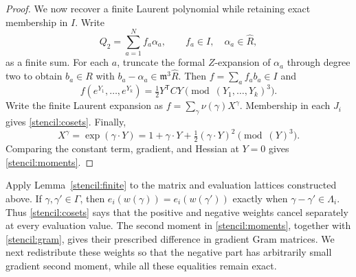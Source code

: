 \begin{proof}
We now recover a finite Laurent polynomial while retaining exact
membership in $I$. Write
\[
 Q_2=\sum_{a=1}^N f_a\alpha_a,
 \qquad f_a\in I,\quad\alpha_a\in\widehat R,
\]
as a finite sum. For each $a$, truncate the formal $Z$-expansion of
$\alpha_a$ through degree two to obtain $b_a\in R$ with
$b_a-\alpha_a\in\mathfrak m^3\widehat R$.
Then $f=\sum_af_ab_a\in I$ and
\[
 f(e^{Y_1},\ldots,e^{Y_k})
 =\tfrac12Y^{\mathsf T}CY\pmod{(Y_1,\ldots,Y_k)^3}.
\]
Write the finite Laurent expansion as
$f=\sum_\gamma\nu(\gamma)X^\gamma$.
Membership in each $J_i$ gives \eqref{stencil:cosets}.
Finally,
\[
 X^\gamma=\exp(\gamma\cdot Y)
 =1+\gamma\cdot Y+\tfrac12(\gamma\cdot Y)^2\pmod{(Y)^3}.
\]
Comparing the constant term, gradient, and Hessian at $Y=0$ gives
\eqref{stencil:moments}.
\end{proof}

Apply Lemma~\ref{stencil:finite} to the matrix and evaluation lattices
constructed above. If $\gamma,\gamma'\in\Gamma$, then
$e_i(w(\gamma))=e_i(w(\gamma'))$ exactly when
$\gamma-\gamma'\in\Lambda_i$. Thus \eqref{stencil:cosets} says that
the positive and negative weights cancel separately at every
evaluation value. The second moment in \eqref{stencil:moments}, together
with \eqref{stencil:gram}, gives their prescribed difference in gradient
Gram matrices. We next redistribute these weights so that the negative
part has arbitrarily small gradient second moment, while all these
equalities remain exact.
